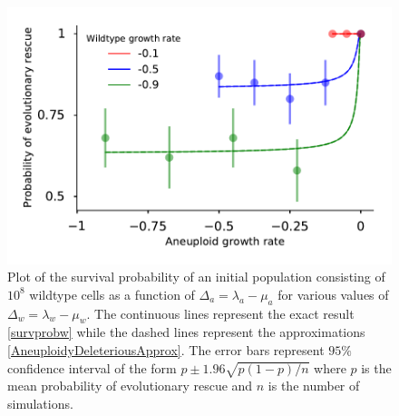\documentclass[12pt]{extarticle}
\begin{document}
\begin{figure}[!t]
 \vspace*{1\baselineskip}
\includegraphics[width=1\textwidth]{Figures/P_est_divergenceLargePopulation.pdf}
\caption{Plot of the survival probability of an initial population consisting of $10^{8}$ wildtype cells as a function of $\Delta_a=\lambda_a-\mu_a$ for various values of $\Delta_w=\lambda_w-\mu_w$. The continuous lines represent the exact result \eqref{survprobw} while the dashed lines represent the approximations \eqref{AneuploidyDeleteriousApprox}. The error bars represent $95\%$ confidence interval of the form $p\pm1.96\sqrt{p\left(1-p\right)/n}$ where $p$ is the mean probability of evolutionary rescue and $n$ is the number of simulations. }
\label{P_est_large_N}
\end{figure}
\end{document}
